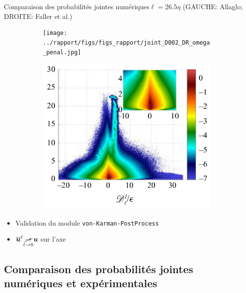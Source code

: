 \documentclass[aspectratio=169,usenames,dvipsnames]{beamer}
\newcommand{\filt}[1]{\overline{#1}^\ell}
\begin{document}
\begin{frame}{Comparaison des probabilités jointes numériques}{$\ell=26.5\eta$
    (GAUCHE: Allaglo; DROITE: Faller et al.)}
    \begin{figure}[H]
        \centering
        \begin{subfigure}[b]{0.48\linewidth}
        \centering
        \texttt{[image: ../rapport/figs/figs\_rapport/joint\_D002\_DR\_omega\_penal.jpg]}
        \end{subfigure}
        \begin{subfigure}[b]{0.4\linewidth}
          \centering
          \includegraphics[width=\textwidth]{figs/faller_l2_dns.png}
          \end{subfigure}
        \label{fig:DR_penal}
      \end{figure}
    \begin{itemize}[label=]\pause
        \item Validation du module \texttt{von-Karman-PostProcess}\pause
        \item {\color{green}$\filt{\git{u}}\underset{\ell\to 0}{\cancel\to} \git{u}$ sur l'axe}
    \end{itemize}
    \end{frame}

\subsection{Comparaison des probabilités jointes numériques et expérimentales}
\end{document}
